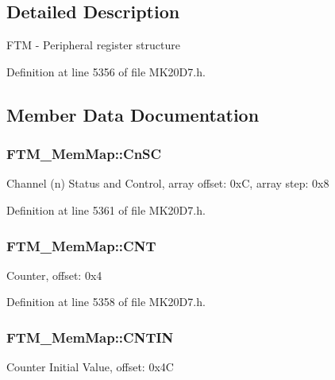 \subsection{Detailed Description}
F\+TM -\/ Peripheral register structure 

Definition at line 5356 of file M\+K20\+D7.\+h.



\subsection{Member Data Documentation}
\subsubsection[{\texorpdfstring{Cn\+SC}{CnSC}}]{ F\+T\+M\+\_\+\+Mem\+Map\+::\+Cn\+SC}\hypertarget{struct_f_t_m___mem_map_a3223f003731ed14e54ee3d9e77ee334c}{}\label{struct_f_t_m___mem_map_a3223f003731ed14e54ee3d9e77ee334c}
Channel (n) Status and Control, array offset\+: 0xC, array step\+: 0x8 

Definition at line 5361 of file M\+K20\+D7.\+h.

\subsubsection[{\texorpdfstring{C\+NT}{CNT}}]{ F\+T\+M\+\_\+\+Mem\+Map\+::\+C\+NT}\hypertarget{struct_f_t_m___mem_map_a21d54fe19908bc95f2fd0107a8af69c2}{}\label{struct_f_t_m___mem_map_a21d54fe19908bc95f2fd0107a8af69c2}
Counter, offset\+: 0x4 

Definition at line 5358 of file M\+K20\+D7.\+h.

\subsubsection[{\texorpdfstring{C\+N\+T\+IN}{CNTIN}}]{ F\+T\+M\+\_\+\+Mem\+Map\+::\+C\+N\+T\+IN}\hypertarget{struct_f_t_m___mem_map_a8b0075986e58bcb446db27764e369135}{}\label{struct_f_t_m___mem_map_a8b0075986e58bcb446db27764e369135}
Counter Initial Value, offset\+: 0x4C 

